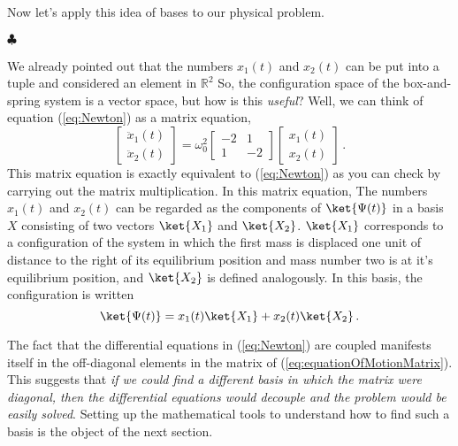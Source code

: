 Now let's apply this idea of bases to our physical problem.
\begin{flushleft} $\clubsuit$ \end{flushleft}
We already pointed out that the numbers $x_1(t)$ and $x_2(t)$ can be put into a tuple and considered an element in $\mathbb{R}^2$
So, the configuration space of the box-and-spring system is a vector space, but how is this \emph{useful}?
Well, we can think of equation (\ref{eq:Newton}) as a matrix equation,
\begin{equation} \label{eq:equationOfMotionMatrix}
\left[ \begin{array}{c} \ddot{x}_1(t) \\ \ddot{x}_2(t) \end{array} \right] = \omega^{2}_{0}\left[ \begin{array}{cc} -2 & 1 \\ 1 & -2 \end{array} \right] \left[ \begin{array}{c} x_{1}(t) \\ x_{2}(t) \end{array} \right] \, .
\end{equation}
This matrix equation is exactly equivalent to (\ref{eq:Newton}) as you can check by carrying out the matrix multiplication.
In this matrix equation, The numbers $x_1(t)$ and $x_2(t)$ can be regarded as the components of $\ket{\Psi (t)}$ in a basis $X$ consisting of two vectors $\ket{X_1}$ and $\ket{X_2}$.
$\ket{X_1}$ corresponds to a configuration of the system in which the first mass is displaced one unit of distance to the right of its equilibrium position and mass number two is at it's equilibrium position, and $\ket{X_2}$ is defined analogously.
In this basis, the configuration is written
\begin{equation} \label{eq:Psirep2}
\ket{\Psi (t)} = x_{1}(t)\ket{X_1} + x_{2}(t)\ket{X_2} \, .
\end{equation}

The fact that the differential equations in (\ref{eq:Newton}) are coupled manifests itself in the off-diagonal elements in the matrix of (\ref{eq:equationOfMotionMatrix}).
This suggests that \emph{if we could find a different basis in which the matrix were diagonal, then the differential equations would decouple and the problem would be easily solved}.
Setting up the mathematical tools to understand how to find such a basis is the object of the next section.

